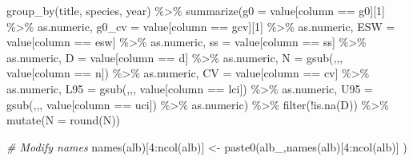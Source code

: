 \documentclass[
]{book}
\newenvironment{Shaded}{\begin{snugshade}}{\end{snugshade}}
\newcommand{\AttributeTok}[1]{\textcolor[rgb]{0.77,0.63,0.00}{#1}}
\newcommand{\CommentTok}[1]{\textcolor[rgb]{0.56,0.35,0.01}{\textit{#1}}}
\newcommand{\DecValTok}[1]{\textcolor[rgb]{0.00,0.00,0.81}{#1}}
\newcommand{\FunctionTok}[1]{\textcolor[rgb]{0.00,0.00,0.00}{#1}}
\newcommand{\NormalTok}[1]{#1}
\newcommand{\OtherTok}[1]{\textcolor[rgb]{0.56,0.35,0.01}{#1}}
\newcommand{\SpecialCharTok}[1]{\textcolor[rgb]{0.00,0.00,0.00}{#1}}
\newcommand{\StringTok}[1]{\textcolor[rgb]{0.31,0.60,0.02}{#1}}
\begin{document}
\begin{Shaded}
\begin{Highlighting}[]
    \FunctionTok{group\_by}\NormalTok{(title, species, year) }\SpecialCharTok{\%\textgreater{}\%}
    \FunctionTok{summarize}\NormalTok{(}\AttributeTok{g0 =}\NormalTok{ value[column }\SpecialCharTok{==} \StringTok{\textquotesingle{}g0\textquotesingle{}}\NormalTok{][}\DecValTok{1}\NormalTok{] }\SpecialCharTok{\%\textgreater{}\%}\NormalTok{ as.numeric,}
              \AttributeTok{g0\_cv =}\NormalTok{ value[column }\SpecialCharTok{==} \StringTok{\textquotesingle{}gcv\textquotesingle{}}\NormalTok{][}\DecValTok{1}\NormalTok{] }\SpecialCharTok{\%\textgreater{}\%}\NormalTok{ as.numeric,}
              \AttributeTok{ESW =}\NormalTok{ value[column }\SpecialCharTok{==} \StringTok{\textquotesingle{}esw\textquotesingle{}}\NormalTok{] }\SpecialCharTok{\%\textgreater{}\%}\NormalTok{ as.numeric,}
              \AttributeTok{ss =}\NormalTok{ value[column }\SpecialCharTok{==} \StringTok{\textquotesingle{}ss\textquotesingle{}}\NormalTok{] }\SpecialCharTok{\%\textgreater{}\%}\NormalTok{ as.numeric,}
              \AttributeTok{D =}\NormalTok{ value[column }\SpecialCharTok{==} \StringTok{\textquotesingle{}d\textquotesingle{}}\NormalTok{] }\SpecialCharTok{\%\textgreater{}\%}\NormalTok{ as.numeric,}
              \AttributeTok{N =} \FunctionTok{gsub}\NormalTok{(}\StringTok{\textquotesingle{},\textquotesingle{}}\NormalTok{,}\StringTok{\textquotesingle{}\textquotesingle{}}\NormalTok{, value[column }\SpecialCharTok{==} \StringTok{\textquotesingle{}n\textquotesingle{}}\NormalTok{]) }\SpecialCharTok{\%\textgreater{}\%}\NormalTok{ as.numeric,}
              \AttributeTok{CV =}\NormalTok{ value[column }\SpecialCharTok{==} \StringTok{\textquotesingle{}cv\textquotesingle{}}\NormalTok{] }\SpecialCharTok{\%\textgreater{}\%}\NormalTok{ as.numeric,}
              \AttributeTok{L95 =} \FunctionTok{gsub}\NormalTok{(}\StringTok{\textquotesingle{},\textquotesingle{}}\NormalTok{,}\StringTok{\textquotesingle{}\textquotesingle{}}\NormalTok{, value[column }\SpecialCharTok{==} \StringTok{\textquotesingle{}lci\textquotesingle{}}\NormalTok{]) }\SpecialCharTok{\%\textgreater{}\%}\NormalTok{ as.numeric,}
              \AttributeTok{U95 =} \FunctionTok{gsub}\NormalTok{(}\StringTok{\textquotesingle{},\textquotesingle{}}\NormalTok{,}\StringTok{\textquotesingle{}\textquotesingle{}}\NormalTok{, value[column }\SpecialCharTok{==} \StringTok{\textquotesingle{}uci\textquotesingle{}}\NormalTok{]) }\SpecialCharTok{\%\textgreater{}\%}\NormalTok{ as.numeric) }\SpecialCharTok{\%\textgreater{}\%}
    \FunctionTok{filter}\NormalTok{(}\SpecialCharTok{!}\FunctionTok{is.na}\NormalTok{(D)) }\SpecialCharTok{\%\textgreater{}\%}
    \FunctionTok{mutate}\NormalTok{(}\AttributeTok{N =} \FunctionTok{round}\NormalTok{(N))}

\CommentTok{\# Modify names}
\FunctionTok{names}\NormalTok{(alb)[}\DecValTok{4}\SpecialCharTok{:}\FunctionTok{ncol}\NormalTok{(alb)] }\OtherTok{\textless{}{-}} \FunctionTok{paste0}\NormalTok{(}\StringTok{\textquotesingle{}alb\_\textquotesingle{}}\NormalTok{,}\FunctionTok{names}\NormalTok{(alb)[}\DecValTok{4}\SpecialCharTok{:}\FunctionTok{ncol}\NormalTok{(alb)] )}
\end{Highlighting}
\end{Shaded}
\end{document}
